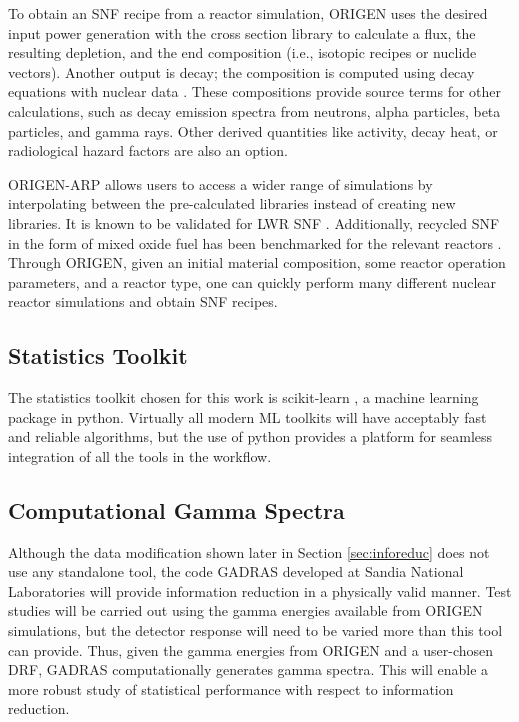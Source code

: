 To obtain an \gls{SNF} recipe from a reactor simulation, \gls{ORIGEN} uses the
desired input power generation with the cross section library to calculate a
flux, the resulting depletion, and the end composition (i.e., isotopic recipes
or nuclide vectors).  Another output is decay; the composition is computed
using decay equations with nuclear data \cite{endf}. These compositions provide
source terms for other calculations, such as decay emission spectra from
neutrons, alpha particles, beta particles, and gamma rays. Other derived
quantities like activity, decay heat, or radiological hazard factors are also
an option.

\gls{ORIGEN-ARP} allows users to access a wider range of simulations by
interpolating between the pre-calculated libraries instead of creating new
libraries.  It is known to be validated for \gls{LWR} \gls{SNF}
\cite{lwr_valid}. Additionally, recycled \gls{SNF} in the form of mixed oxide
fuel has been benchmarked for the relevant reactors \cite{mox_valid}.  Through
\gls{ORIGEN}, given an initial material composition, some reactor operation
parameters, and a reactor type, one can quickly perform many different nuclear
reactor simulations and obtain \gls{SNF} recipes.

\subsection{Statistics Toolkit}

The statistics toolkit chosen for this work is scikit-learn \cite{scikit}, a
machine learning package in python.  Virtually all modern \gls{ML}
toolkits will have acceptably fast and reliable algorithms, but the use of
python provides a platform for seamless integration of all the tools in the
workflow. 

\subsection{Computational Gamma Spectra}

Although the data modification shown later in Section \ref{sec:inforeduc} does
not use any standalone tool, the code \gls{GADRAS} \cite{gadras} developed at
Sandia National Laboratories will provide information reduction in a physically
valid manner.  Test studies will be carried out using the gamma energies
available from \gls{ORIGEN} simulations, but the detector response will need to
be varied more than this tool can provide. Thus, given the gamma energies from
\gls{ORIGEN} and a user-chosen \gls{DRF}, \gls{GADRAS} computationally
generates gamma spectra.  This will enable a more robust study of statistical
performance with respect to information reduction.

